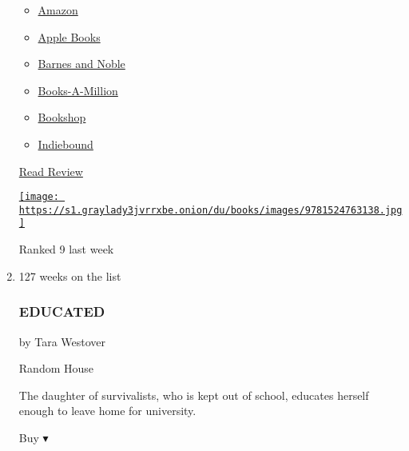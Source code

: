 \begin{enumerate}
  \begin{itemize}
  \tightlist
  \item
    \href{https://www.amazon.com/Becoming-Michelle-Obama/dp/1524763136?tag=NYTBS-20}{Amazon}
  \item
    \href{https://du-gae-books-dot-nyt-du-prd.appspot.com/buy?title=BECOMING\&author=Michelle+Obama}{Apple
    Books}
  \item
    \href{https://www.anrdoezrs.net/click-7990613-11819508?url=https\%3A\%2F\%2Fwww.barnesandnoble.com\%2Fw\%2F\%3Fean\%3D9781524763138}{Barnes
    and Noble}
  \item
    \href{https://www.anrdoezrs.net/click-7990613-35140?url=https\%3A\%2F\%2Fwww.booksamillion.com\%2Fp\%2FBECOMING\%2FMichelle\%2BObama\%2F9781524763138}{Books-A-Million}
  \item
    \href{https://bookshop.org/a/3546/9781524763138}{Bookshop}
  \item
    \href{https://www.indiebound.org/book/9781524763138?aff=NYT}{Indiebound}
  \end{itemize}

  \href{https://www.nytimes3xbfgragh.onion/2018/12/06/books/review/michelle-obama-becoming-memoir.html}{Read
  Review}

  \href{https://www.nytimes3xbfgragh.onion/2018/12/06/books/review/michelle-obama-becoming-memoir.html}{\texttt{[image: https://s1.graylady3jvrrxbe.onion/du/books/images/9781524763138.jpg]}}

  Ranked 9 last week
\item
  \href{https://www.nytimes3xbfgragh.onion/2018/03/01/books/review/tara-westover-educated.html}{}

  127 weeks on the list

  \hypertarget{educated}{%
  \subsubsection{EDUCATED}\label{educated}}

  by Tara Westover

  Random House

  The daughter of survivalists, who is kept out of school, educates
  herself enough to leave home for university.

  Buy ▾


\end{enumerate}
